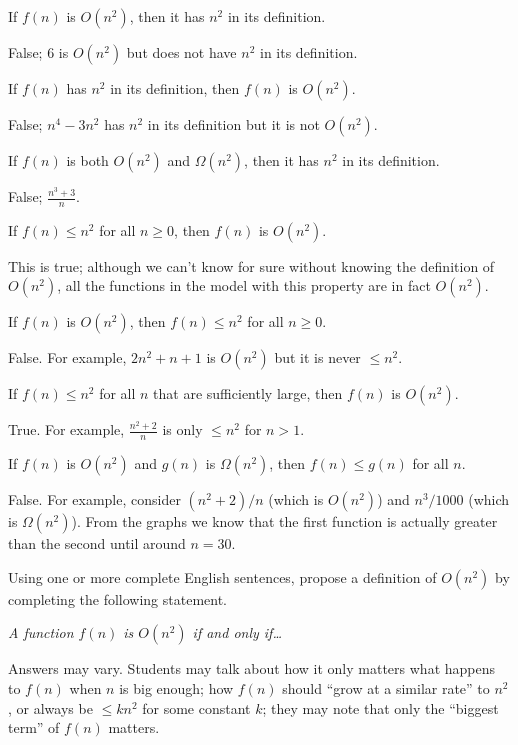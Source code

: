 \documentclass{tufte-handout}
\begin{document}
\begin{questions}
\item If $f(n)$ is $O(n^2)$, then it has $n^2$ in its definition.
  \begin{answer} False; \eg $6$ is $O(n^2)$ but does not have $n^2$
    in its definition.\end{answer}
\item If $f(n)$ has $n^2$ in its definition, then $f(n)$ is $O(n^2)$.
  \begin{answer} False; \eg $n^4 - 3n^2$ has $n^2$ in its definition
    but it is not $O(n^2)$.\end{answer}
\item If $f(n)$ is both $O(n^2)$ and $\Omega(n^2)$, then it has $n^2$
  in its definition.
  \begin{answer} False; \eg $\frac{n^3 + 3}{n}$. \end{answer}
\item If $f(n) \leq n^2$ for all $n \geq 0$, then $f(n)$ is $O(n^2)$.
  \begin{answer} This is true; although we can't know for sure without
    knowing the definition of $O(n^2)$, all the functions in the model
    with this property are in fact $O(n^2)$. \end{answer}
\item If $f(n)$ is $O(n^2)$, then $f(n) \leq n^2$ for all $n \geq 0$.
  \begin{answer}
    False.  For example, $2n^2 + n + 1$ is $O(n^2)$ but it is never
    $\leq n^2$.
  \end{answer}
\item If $f(n) \leq n^2$ for all $n$ that are sufficiently large, then
  $f(n)$ is $O(n^2)$.
  \begin{answer}
    True.  For example, $\frac{n^2 + 2}{n}$ is only $\leq n^2$ for $n
    > 1$.
  \end{answer}
\item If $f(n)$ is $O(n^2)$ and $g(n)$ is $\Omega(n^2)$, then $f(n)
  \leq g(n)$ for all $n$.
  \begin{answer}
    False.  For example, consider $(n^2 + 2)/n$ (which is $O(n^2)$)
    and $n^3/1000$ (which is $\Omega(n^2)$).  From the graphs we know
    that the first function is actually greater than the second until
    around $n = 30$.
  \end{answer}
\item Using one or more complete English sentences, propose a
  definition of $O(n^2)$ by completing the following statement.

  \emph{A function $f(n)$ is $O(n^2)$ if and only if\dots}

  \begin{answer}
    Answers may vary.  Students may talk about how it only matters
    what happens to $f(n)$ when $n$ is big enough; how $f(n)$ should
    ``grow at a similar rate'' to $n^2$, or always be $\leq kn^2$ for
    some constant $k$; they may note that only the ``biggest term'' of
    $f(n)$ matters.
  \end{answer}
\end{questions}
\end{document}
